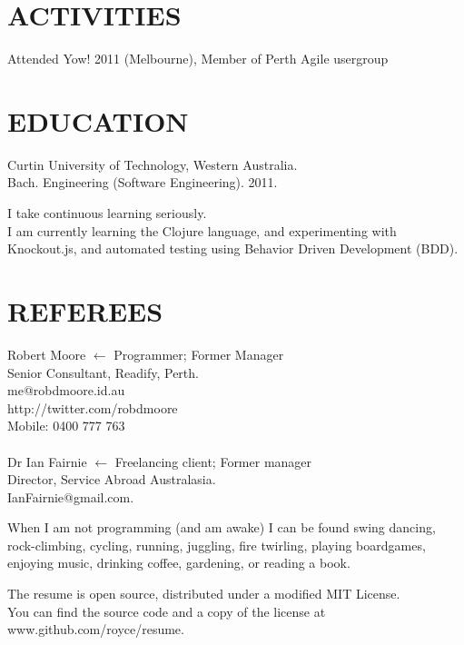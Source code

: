 \documentclass[margin]{res}
\begin{document}
\begin{resume}

  \section{ACTIVITIES}
  Attended Yow! 2011 (Melbourne),
  Member of Perth Agile usergroup

  \section{EDUCATION}
  Curtin University of Technology, Western Australia. \\
  Bach. Engineering (Software Engineering). 2011.
  
  I take continuous learning seriously.\\
  I am currently learning the Clojure language, and experimenting with Knockout.js, and automated testing using
  Behavior Driven Development (BDD).

  \section{REFEREES}
  Robert Moore
  \hfill $\longleftarrow$ Programmer; Former Manager\\
  Senior Consultant, Readify, Perth. \\
  me@robdmoore.id.au \\
  http://twitter.com/robdmoore \\
  Mobile: 0400 777 763 \\
  \\
  Dr Ian Fairnie
  \hfill $\longleftarrow$ Freelancing client; Former manager\\
  Director, Service Abroad Australasia. \\
  IanFairnie@gmail.com. \\

\end{resume} 

\vfill
\centering

\hspace{-1.75in}  When I am not programming (and am awake) I can be found swing dancing, \\
\hspace{-1.75in}  rock-climbing, cycling, running, juggling, fire twirling, playing boardgames, \\
\hspace{-1.75in}  enjoying music, drinking coffee, gardening, or reading a book.

\vfill
\hspace{-1.75in}  The resume is open source, distributed under a modified MIT License. \\
\hspace{-1.75in}  You can find the source code and a copy of the license at www.github.com/royce/resume.
\vfill
\end{document}

